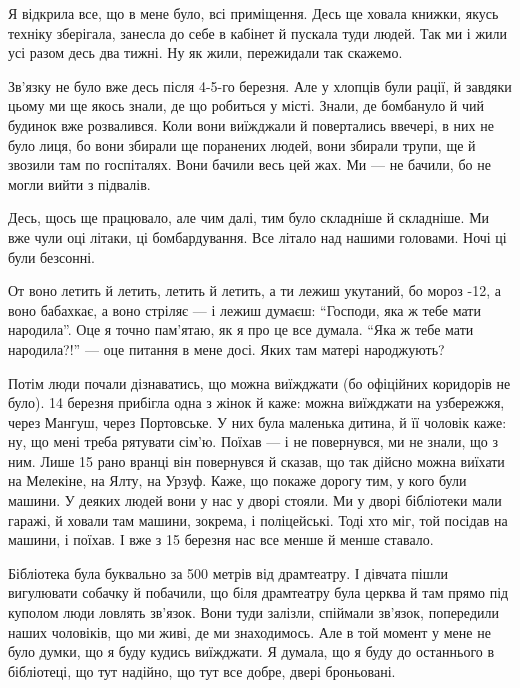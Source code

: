 Я відкрила все, що в мене було, всі приміщення. Десь ще ховала книжки, якусь
техніку зберігала, занесла до себе в кабінет й пускала туди людей. Так ми і
жили усі разом десь два тижні. Ну як жили, пережидали так скажемо.

Зв'язку не було вже десь після 4-5-го березня. Але у хлопців були рації, й
завдяки цьому ми ще якось знали, де що робиться у місті. Знали, де бомбануло й
чий будинок вже розвалився. Коли вони виїжджали й повертались ввечері, в них не
було лиця, бо вони збирали ще поранених людей, вони збирали трупи, ще й звозили
там по госпіталях. Вони бачили весь цей жах. Ми — не бачили, бо не могли вийти
з підвалів.


Десь, щось ще працювало, але чим далі, тим було складніше й складніше. Ми вже
чули оці літаки, ці бомбардування. Все літало над нашими головами. Ночі ці були
безсонні.

\begin{qqquote}
От воно летить й летить, летить й летить, а ти лежиш укутаний, бо мороз -12, а
воно бабахкає, а воно стріляє — і лежиш думаєш: \enquote{Господи, яка ж тебе мати
народила}. Оце я точно пам'ятаю, як я про це все думала. \enquote{Яка ж тебе мати
народила?!} — оце питання в мене досі. Яких там матері народжують?	
\end{qqquote}

Потім люди почали дізнаватись, що можна виїжджати (бо офіційних коридорів не
було). 14 березня прибігла одна з жінок й каже: можна виїжджати на узбережжя,
через Мангуш, через Портовське. У них була маленька дитина, й її чоловік каже:
ну, що мені треба рятувати сім'ю. Поїхав — і не повернувся, ми не знали, що з
ним. Лише 15 рано вранці він повернувся й сказав, що так дійсно можна виїхати
на Мелекіне, на Ялту, на Урзуф. Каже, що покаже дорогу тим, у кого були машини.
У деяких людей вони у нас у дворі стояли. Ми у дворі бібліотеки мали гаражі, й
ховали там машини, зокрема, і поліцейські. Тоді хто міг, той посідав на машини,
і поїхав. І вже з 15 березня нас все менше й менше ставало.

Бібліотека була буквально за 500 метрів від драмтеатру. І дівчата пішли
вигулювати собачку й побачили, що біля драмтеатру була церква й там прямо під
куполом люди ловлять зв'язок. Вони туди залізли, спіймали зв'язок, попередили
наших чоловіків, що ми живі, де ми знаходимось. Але в той момент у мене не було
думки, що я буду кудись виїжджати. Я думала, що я буду до останнього в
бібліотеці, що тут надійно, що тут все добре, двері броньовані.

